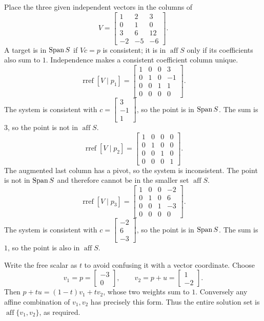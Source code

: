 Place the three given independent vectors in the columns of
\[V=\begin{bmatrix}1&2&3\\0&1&0\\3&6&12\\-2&-5&-6\end{bmatrix}.\]
A target is in $\operatorname{Span} S$ if $Vc=p$ is consistent; it is in $\operatorname{aff}S$ only if its coefficients also sum to $1$. Independence makes a consistent coefficient column unique.
\[\operatorname{rref}[V\mid p_{1}]=\begin{bmatrix}1&0&0&3\\0&1&0&-1\\0&0&1&1\\0&0&0&0\end{bmatrix}.\]
The system is consistent with $c=\begin{bmatrix}3\\-1\\1\end{bmatrix}$, so the point is in $\operatorname{Span} S$. The sum is $3$, so the point is not in $\operatorname{aff}S$.
\[\operatorname{rref}[V\mid p_{2}]=\begin{bmatrix}1&0&0&0\\0&1&0&0\\0&0&1&0\\0&0&0&1\end{bmatrix}.\]
The augmented last column has a pivot, so the system is inconsistent. The point is not in $\operatorname{Span} S$ and therefore cannot be in the smaller set $\operatorname{aff}S$.
\[\operatorname{rref}[V\mid p_{3}]=\begin{bmatrix}1&0&0&-2\\0&1&0&6\\0&0&1&-3\\0&0&0&0\end{bmatrix}.\]
The system is consistent with $c=\begin{bmatrix}-2\\6\\-3\end{bmatrix}$, so the point is in $\operatorname{Span} S$. The sum is $1$, so the point is also in $\operatorname{aff}S$.


Write the free scalar as $t$ to avoid confusing it with a vector coordinate. Choose
\[v_1=p=\begin{bmatrix}-3\\0\end{bmatrix},\qquad v_2=p+u=\begin{bmatrix}1\\-2\end{bmatrix}.\]
Then $p+tu=(1-t)v_1+tv_2$, whose two weights sum to $1$. Conversely any affine combination of $v_1,v_2$ has precisely this form. Thus the entire solution set is $\operatorname{aff}\{v_1,v_2\}$, as required.

